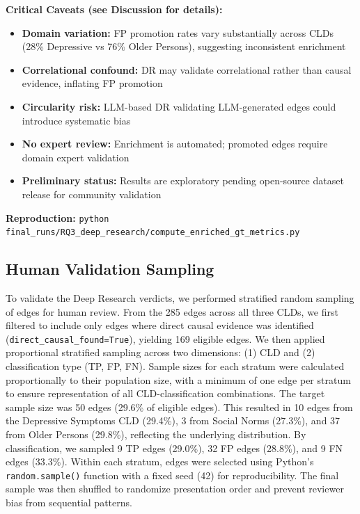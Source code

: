 \textbf{Critical Caveats (see Discussion for details):}
\begin{itemize}[noitemsep]
    \item \textbf{Domain variation:} FP promotion rates vary substantially across CLDs (28\% Depressive vs 76\% Older Persons), suggesting inconsistent enrichment
    \item \textbf{Correlational confound:} DR may validate correlational rather than causal evidence, inflating FP promotion
    \item \textbf{Circularity risk:} LLM-based DR validating LLM-generated edges could introduce systematic bias
    \item \textbf{No expert review:} Enrichment is automated; promoted edges require domain expert validation
    \item \textbf{Preliminary status:} Results are exploratory pending open-source dataset release for community validation
\end{itemize}

\textbf{Reproduction:} \texttt{python final\_runs/RQ3\_deep\_research/compute\_enriched\_gt\_metrics.py}

\subsection{Human Validation Sampling}
\label{sec:rq3_human_validation}

To validate the Deep Research verdicts, we performed stratified random sampling of edges for human review. From the 285 edges across all three CLDs, we first filtered to include only edges where direct causal evidence was identified (\texttt{direct\_causal\_found=True}), yielding 169 eligible edges. We then applied proportional stratified sampling across two dimensions: (1) CLD and (2) classification type (TP, FP, FN). Sample sizes for each stratum were calculated proportionally to their population size, with a minimum of one edge per stratum to ensure representation of all CLD-classification combinations. The target sample size was 50 edges (29.6\% of eligible edges). This resulted in 10 edges from the Depressive Symptoms CLD (29.4\%), 3 from Social Norms (27.3\%), and 37 from Older Persons (29.8\%), reflecting the underlying distribution. By classification, we sampled 9 TP edges (29.0\%), 32 FP edges (28.8\%), and 9 FN edges (33.3\%). Within each stratum, edges were selected using Python's \texttt{random.sample()} function with a fixed seed (42) for reproducibility. The final sample was then shuffled to randomize presentation order and prevent reviewer bias from sequential patterns.

